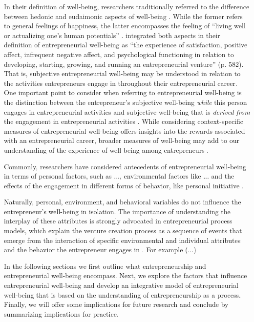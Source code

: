 \documentclass[a4paper,man,noextraspace,natbib]{apa6}
\begin{document}
In their definition of well-being, researchers traditionally referred to the difference between hedonic and eudaimonic aspects of well-being \citep{Deci2008}. 
While the former refers to general feelings of happiness, the latter encompasses the feeling of “living well or actualizing one’s human potentials” \cite[p.~2]{Deci2008}. 
\cite{Wiklund2019} integrated both aspects in their definition of entrepreneurial well-being as “the experience of satisfaction, positive affect, infrequent negative affect, and psychological functioning in relation to developing, starting, growing, and running an entrepreneurial venture” (p. 582). 
That is, subjective entrepreneurial well-being may be understood in relation to the activities entrepreneurs engage in throughout their entrepreneurial career. 
One important point to consider when referring to entrepreneurial well-being is the distinction between the entrepreneur's subjective well-being \textit{while} this person engages in entrepreneurial activities and subjective well-being that is \textit{derived from} the engagement in entrepreneurial activities \citep{Wiklund2019}. 
While considering context-specific measures of entrepreneurial well-being offers insights into the rewards associated with an entrepreneurial career, broader measures of well-being may add to our understanding of the experience of well-being among entrepreneurs \cite[p.582] {Wiklund2019}. \par

Commonly, researchers have considered antecedents of entrepreneurial well-being in terms of personal factors, such as ..., environmental factors like ... and the effects of the engagement in different forms of behavior, like personal initiative \citep{Hahn2012}. \par 

Naturally, personal, environment, and behavioral variables do not influence the entrepreneur's well-being in isolation. 
The importance of understanding the interplay of these attributes is strongly advocated in entrepreneurial process models, which explain the venture creation process as a sequence of events that emerge from the interaction of specific environmental and individual attributes and the behavior the entrepreneur engages in \cite{Moroz2012}. For example (...) \par

In the following sections we first outline what entrepreneurship and entrepreneurial well-being encompass. 
Next, we explore the factors that influence entrepreneurial well-being and develop an integrative model of entrepreneurial well-being that is based on the understanding of entrepreneurship as a process. 
Finally, we will offer some implications for future research and conclude by summarizing implications for practice.
\end{document}
